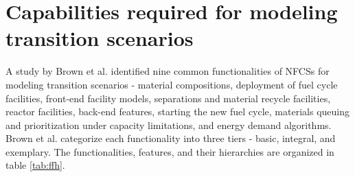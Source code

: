 \section{Capabilities required for modeling transition scenarios}
A study by Brown et al. \cite{brown_identification_2016}
identified nine common functionalities of \glspl{NFCS} for modeling
transition scenarios - material compositions, deployment of fuel
cycle facilities, front-end facility models, separations and material
recycle facilities, reactor facilities, back-end features, starting
the new fuel cycle, materials queuing and prioritization under
capacity limitations, and energy demand algorithms. Brown et al.
categorize each functionality into three tiers - basic, integral,
and exemplary. The functionalities, features, and their hierarchies
are organized in table \ref{tab:ffh}.

